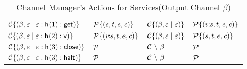 \documentclass[11pt]{article}
\newcommand{\<}{\langle}
\renewcommand{\>}{\rangle}
\begin{document}
\begin{table}[!h]
\begin{center}
\begin{tabular}{|l|l||l|l|} \hline
${\cal C}\{ (\beta , \varepsilon \mid \varepsilon :{\sf h}(1):{\sf get}) \}$ &  ${\cal P}\{(s,t,e,c)\}$ & ${\cal C}\{ (\beta,\varepsilon \mid \varepsilon) \}$ & ${\cal P}\{(v\!\!:\!\! s,t,e,c)\}$ \\ \hline

${\cal C}\{ (\beta , \varepsilon \mid \varepsilon :{\sf h}(2):{\sf v}) \}$ & ${\cal P}\{(v\!\!:\!\! s,t,e,c)\}$ & ${\cal C}\{ (\beta,\varepsilon \mid \varepsilon) \}$ & ${\cal P}\{(s,t,e,c)\}$\\ \hline

${\cal C}\{ (\beta , \varepsilon \mid \varepsilon :{\sf h}(3):{\sf close}) \}$ & ${\cal P}$ & ${\cal C}~\backslash~\beta $ & ${\cal P}$ \\ \hline

${\cal C}\{ (\beta , \varepsilon \mid \varepsilon :{\sf h}(3):{\sf halt}) \}$ & ${\cal P}$ & ${\cal C}~\backslash~\beta $ & ${\cal P}$ \\ \hline


\end{tabular}
\caption{Channel Manager's Actions for Services(Output Channel $\beta$)}
\label{channel-actions-Serv}
\end{center}
\end{table}
\end{document}
